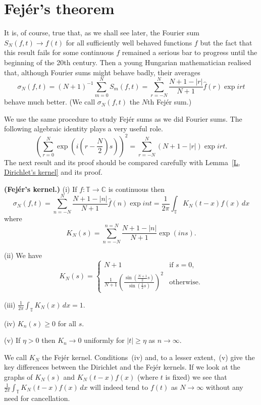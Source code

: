 \section{Fej\'{e}r's theorem} It is, of course, true that,
as we shall see later, the Fourier sum $S_{N}(f,t)\rightarrow f(t)$
for all sufficiently well behaved functions $f$ but
the fact that this result fails for some continuous $f$
remained a serious bar to progress until the beginning
of the 20th century. Then a young Hungarian
mathematician realised that, although Fourier sums might
behave badly, their averages
\[\sigma_{N}(f,t)=(N+1)^{-1}\sum_{m=0}^{N}S_{m}(f,t)
=\sum_{r=-N}^{N}\frac{N+1-|r|}{N+1}\hat{f}(r)\exp irt\]
behave much better. (We call $\sigma_{N}(f,t)$ the
$N$th Fej\'{e}r sum.)

We use the same procedure to study Fej\'{e}r sums
as we did Fourier sums. The following algebraic
identity plays a very useful role.
\[\left(\sum_{r=0}^{N}\exp\left( i(r-\frac{N}{2})s\right)\right)^{2}
=\sum_{r=-N}^{N}(N+1-|r|)\exp irt.\]
The next result and its proof should be compared carefully
with Lemma~\ref{L, Dirichlet's kernel} and its proof.


\begin{lemma}{\bf (Fej\'{e}r's kernel.)}\label{L, Fejer's kernel}
(i) If $f:{\mathbb T}\rightarrow{\mathbb C}$ is continuous then
\[\sigma_{N}(f,t)=\sum_{n=-N}^{N}\frac{N+1-|n|}{N+1}\hat{f}(n)\exp int=
\frac{1}{2\pi}\int_{\mathbb T}K_{N}(t-x)f(x)\,dx\]
where
\[K_{N}(s)=\sum_{n=-N}^{n=N}\frac{N+1-|n|}{N+1}\exp(ins).\]

(ii) We have
\begin{equation*}
K_{N}(s)=
\begin{cases}N+1&\text{if $s=0$,}\\
\frac{1}{N+1}\left(\frac{\sin(\tfrac{N+1}{2}s)}
{\sin(\tfrac{1}{2}s)}\right)^{2}&\text{otherwise.}
\end{cases}
\end{equation*}

(iii) ${\displaystyle \frac{1}{2\pi}\int_{\mathbb T}K_{N}(x)\,dx=1.}$

(iv) $K_{n}(s)\geq 0$ for all $s$.

(v) If $\eta>0$ then $K_{n}\rightarrow 0$ uniformly
for $|t|\geq \eta$
as $n\rightarrow\infty$.
\end{lemma}
We call $K_{N}$ the Fej\'{e}r kernel.
Conditions~(iv) and, to a lesser extent,~(v)
give the key differences between the Dirichlet
and the Fej\'{e}r kernels.
If we look at the graphs of $K_{N}(s)$ and $K_{N}(t-x)f(x)$
(where $t$ is fixed) we see that
$\frac{1}{2\pi}\int_{\mathbb T}K_{N}(t-x)f(x)\,dx$
will indeed tend to $f(t)$ as $N\rightarrow\infty$
without any need for cancellation.

